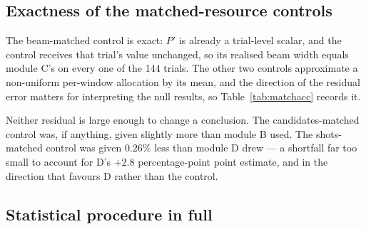 \documentclass[preprint,11pt]{elsarticle}
\begin{document}
\subsection{Exactness of the matched-resource controls}

The beam-matched control is exact: $P'$ is already a trial-level scalar,
and the control receives that trial's value unchanged, so its realised
beam width equals module C's on every one of the 144 trials. The other
two controls approximate a non-uniform per-window allocation by its mean,
and the direction of the residual error matters for interpreting the null
results, so Table~\ref{tab:matchacc} records it.

\begin{table}[h]
\centering\small
\caption{How closely each matched-resource control reproduced the
adaptive arm's realised budget, canonical grid, from
\texttt{phase7\_matched\_resource.csv}. A control that is
\emph{over}-matched makes the corresponding null result harder to obtain,
not easier.}
\label{tab:matchacc}
\end{table}

Neither residual is large enough to change a conclusion. The
candidates-matched control was, if anything, given slightly more than
module B used. The shots-matched control was given $0.26\%$ less than
module D drew --- a shortfall far too small to account for D's $+2.8$
percentage-point point estimate, and in the direction that favours D
rather than the control.

\subsection{Statistical procedure in full}
\end{document}
